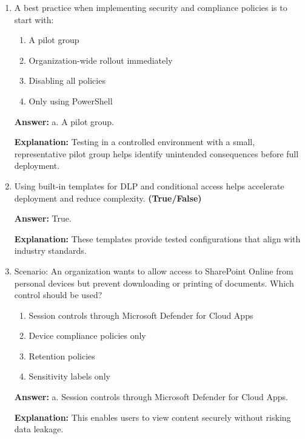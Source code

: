 \documentclass[10pt]{article}
\begin{document}
\begin{enumerate}[leftmargin=*]
\textbf{Answer:} Microsoft Purview portal \textrightarrow{} DLP alerts, audit logs, and policy matches; Microsoft Entra admin center \textrightarrow{} Conditional access sign-ins and policy application; Intune reporting dashboards \textrightarrow{} Device compliance status and app protection enforcement.

\textbf{Explanation:} These tools provide visibility into policy effectiveness and potential violations.

\item A best practice when implementing security and compliance policies is to start with:
\begin{enumerate}[label=\alph*., leftmargin=1.5em]
\item A pilot group
\item Organization-wide rollout immediately
\item Disabling all policies
\item Only using PowerShell
\end{enumerate}
\textbf{Answer:} a. A pilot group.

\textbf{Explanation:} Testing in a controlled environment with a small, representative pilot group helps identify unintended consequences before full deployment.

\item Using built-in templates for DLP and conditional access helps accelerate deployment and reduce complexity. \textbf{(True/False)}

\textbf{Answer:} True.

\textbf{Explanation:} These templates provide tested configurations that align with industry standards.

\item Scenario: An organization wants to allow access to SharePoint Online from personal devices but prevent downloading or printing of documents. Which control should be used?
\begin{enumerate}[label=\alph*., leftmargin=1.5em]
\item Session controls through Microsoft Defender for Cloud Apps
\item Device compliance policies only
\item Retention policies
\item Sensitivity labels only
\end{enumerate}
\textbf{Answer:} a. Session controls through Microsoft Defender for Cloud Apps.

\textbf{Explanation:} This enables users to view content securely without risking data leakage.


\end{enumerate}
\end{document}
